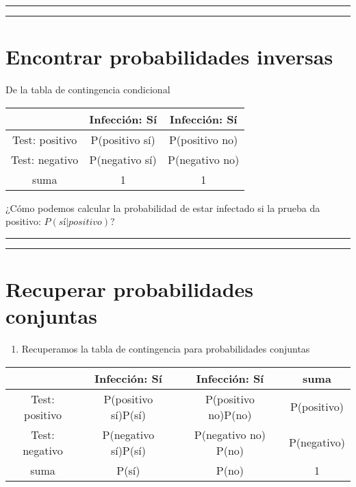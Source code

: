 \documentclass[
]{book}
\providecommand{\tightlist}{%
  \setlength{\itemsep}{0pt}\setlength{\parskip}{0pt}}
\begin{document}
\begin{center}\rule{0.5\linewidth}{0.5pt}\end{center}

\begin{center}\rule{0.5\linewidth}{0.5pt}\end{center}

\hypertarget{encontrar-probabilidades-inversas}{%
\section{Encontrar probabilidades inversas}\label{encontrar-probabilidades-inversas}}

De la tabla de contingencia condicional

\begin{longtable}[]{@{}ccc@{}}
\toprule
& Infección: Sí & Infección: Sí \\
\midrule
\endhead
Test: positivo & P(positivo {\textbar{}} sí) & P(positivo {\textbar{}} no) \\
Test: negativo & P(negativo {\textbar{}} sí) & P(negativo {\textbar{}} no) \\
suma & 1 & 1 \\
\bottomrule
\end{longtable}

¿Cómo podemos calcular la probabilidad de estar infectado si la prueba da positivo: \(P(sí|positivo)\)?

\begin{center}\rule{0.5\linewidth}{0.5pt}\end{center}

\begin{center}\rule{0.5\linewidth}{0.5pt}\end{center}

\hypertarget{recuperar-probabilidades-conjuntas}{%
\section{Recuperar probabilidades conjuntas}\label{recuperar-probabilidades-conjuntas}}

\begin{enumerate}
\def\labelenumi{\arabic{enumi}.}
\tightlist
\item
  Recuperamos la tabla de contingencia para probabilidades conjuntas
\end{enumerate}

\begin{longtable}[]{@{}cccc@{}}
\toprule
& Infección: Sí & Infección: Sí & suma \\
\midrule
\endhead
Test: positivo & P(positivo {\textbar{}} sí)P(sí) & P(positivo {\textbar{}} no)P(no) & P(positivo) \\
Test: negativo & P(negativo {\textbar{}} sí)P(sí) & P(negativo {\textbar{}} no) P(no) & P(negativo) \\
suma & P(sí) & P(no) & 1 \\
\bottomrule
\end{longtable}
\end{document}

